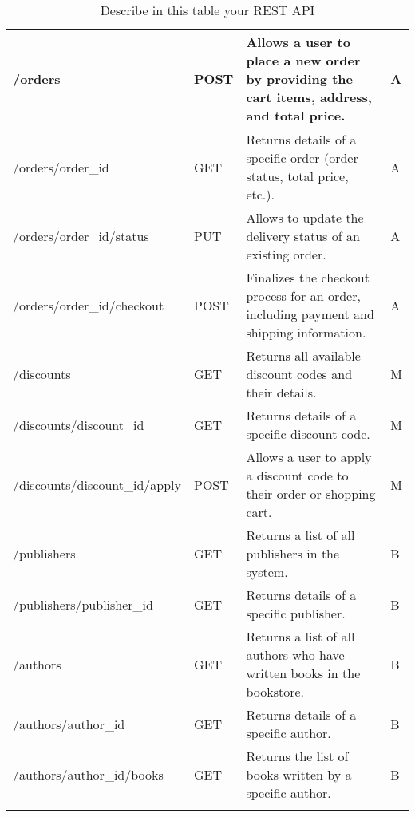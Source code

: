 \begin{longtable}{|p{}|p{} |p{}|p{}|}
\hline 
/orders & POST & Allows a user to place a new order by providing the cart items, address, and total price. & A \\
\hline 
/orders/order\_id & GET & Returns details of a specific order (order status, total price, etc.). & A \\
\hline 
/orders/order\_id/status & PUT & Allows to update the delivery status of an existing order. & A \\
\hline 
/orders/order\_id/checkout & POST & Finalizes the checkout process for an order, including payment and shipping information. & A \\
\hline 
/discounts & GET & Returns all available discount codes and their details. & M \\
\hline 
/discounts/discount\_id & GET & Returns details of a specific discount code. & M \\
\hline 
/discounts/discount\_id/apply & POST & Allows a user to apply a discount code to their order or shopping cart. & M \\
\hline 
/publishers & GET & Returns a list of all publishers in the system. & B \\
\hline 
/publishers/publisher\_id & GET & Returns details of a specific publisher. & B \\
\hline 
/authors & GET & Returns a list of all authors who have written books in the bookstore. & B \\
\hline 
/authors/author\_id & GET & Returns details of a specific author. & B \\
\hline 
/authors/author\_id/books & GET & Returns the list of books written by a specific author. & B
\\\hline

\caption{Describe in this table your REST API}
\label{tab:termGlossary}
\end{longtable}